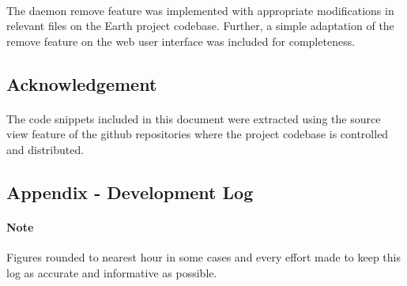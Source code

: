 \documentclass[10pt,a4,oneside]{article}
\begin{document}
\paragraph{}
The daemon remove feature was implemented with appropriate modifications 
in relevant files on the Earth project codebase. Further, a simple 
adaptation of the remove feature on the web user interface was included 
for completeness.

\paragraph{}

\subsection*{Acknowledgement}


\paragraph{}
The code snippets included in this document were extracted using the 
source view feature of the github repositories where the project 
codebase is controlled and distributed.

\paragraph{}


\newpage

\subsection*{Appendix - Development Log}

\paragraph{Note}
Figures rounded to nearest hour in some cases and every effort made 
to keep this log as accurate and informative as possible.
\end{document}
